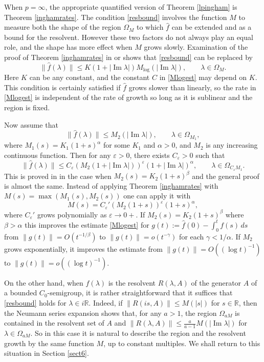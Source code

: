 \documentclass[11pt]{amsart}
\theoremstyle{definition}
\theoremstyle{remark}
\numberwithin{equation}{section}
\begin{document}
When $p=\infty$, the appropriate quantified version of Theorem \ref{lpingham} is  Theorem \ref{inghamrates}.  The condition \eqref{resbound} involves the function $M$ to measure both the shape of the region $\Omega_M$ to which $\widehat f$ can be extended and as a bound for the resolvent.  However these two factors do not always play an equal role, and the shape has more effect when $M$ grows slowly.   Examination of the proof of Theorem \ref{inghamrates} in \cite{BaDu} or \cite[Theorem 4.4.6]{ABHN01} shows that \eqref{resbound} can be replaced by
\[
 \|\widehat f(\lambda)\|\le K (1+|{\operatorname{Im}}\lambda|) M_{\log}(|{\operatorname{Im}} \lambda |), \qquad \lambda \in \Omega_M.
 \]
Here $K$ can be any constant, and the constant $C$ in \eqref{Mlogest} may depend on $K$.  This condition is certainly satisfied if $\widehat f$ grows slower than linearly, so the rate in \eqref{Mlogest} is independent of the rate of growth so long as it is sublinear and the region is fixed.

Now assume that
\[
 \|\widehat f(\lambda)\|\le M_2(|{\operatorname{Im}} \lambda |), \qquad \lambda \in \Omega_{M_1},
 \]
where $M_1(s) = K_1(1+s)^\alpha$ for some $K_1$ and  $\alpha>0$, and $M_2$ is any increasing continuous function.  Then for any ${{\varepsilon}}>0$, there exists $C_{{\varepsilon}}>0$ such that
\[
 \|\widehat f(\lambda)\|\le C_{{\varepsilon}} (M_2(1+|{\operatorname{Im}} \lambda |))^{{\varepsilon}} (1+|{\operatorname{Im}}\lambda|)^\alpha, \qquad \lambda \in \Omega_{C_{{\varepsilon}} M_1}.
 \]
This is proved in \cite[Lemma 3.4]{BoTo10} in the case when $M_2(s) =K_2(1+s)^\beta$ and the general proof is almost the same.  Instead of applying Theorem \ref{inghamrates} with $M(s) = \max(M_1(s), M_2(s))$ one can apply it with
\[
M(s) = C_{{\varepsilon}}' (M_2(1+s))^{{\varepsilon}} (1+s)^\alpha,
\]
where $C_{{\varepsilon}}'$ grows polynomially as ${{\varepsilon}}\to0+$.  If $M_2(s) = K_2(1+s)^\beta$ where $\beta>\alpha$ this improves the estimate \eqref{Mlogest} for $g(t) := \widehat f(0) - \int_0^t f(s) \, ds$ from $\|g(t)\| = O(t^{-1/\beta})$ to $\|g(t)\| = o(t^{-\gamma})$ for each $\gamma<1/\alpha$.  If $M_2$ grows exponentially, it improves the estimate from $\|g(t)\| = O((\log t)^{-1})$ to  $\|g(t)\| = o((\log t)^{-1})$.

On the other hand, when $f(\lambda)$ is the resolvent $R(\lambda, A)$ of the generator $A$ of a bounded $C_0$-semigroup, it is rather straightforward that it suffices that \eqref{resbound} holds for $\lambda \in i{{\mathbb R}}$. Indeed, if $\|R(is, A)\| \le M(|s|)$ for $s \in \mathbb R$, then the Neumann series expansion shows that, for any $a > 1$, the region $\Omega_{aM}$ is contained in the resolvent set of $A$  and $\|R(\lambda, A)\|\le \frac{a}{a-1} M(|{\operatorname{Im}} \lambda|)$ for $\lambda \in \Omega_{aM}$.  So in this case it is natural to describe the region and the resolvent growth by the same function $M$, up to constant multiples.  We shall return to this situation in Section \ref{sect6}.
\end{document}
